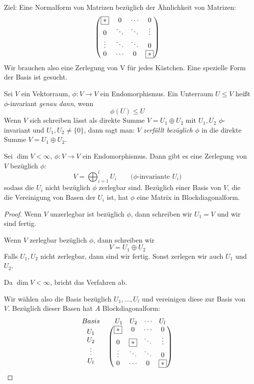 \documentclass[a4paper, 10pt]{scrbook}
\begin{document}
Ziel: Eine Normalform von Matrizen bezüglich der Ähnlichkeit von Matrizen:
\[
\begin{pmatrix}\fbox{$*$} & 0 & \cdots & 0 \\ 0 & \ddots & \ddots & \vdots \\ \vdots & \ddots & \ddots & 0 \\ 0 & \cdots & 0 & \fbox{$*$}  \end{pmatrix}
\]
Wir brauchen also eine Zerlegung von V für jedes Kästchen.  Eine spezielle Form der Basis ist gesucht.

\begin{df}
\label{12.6}
Sei $V$ ein Vektorraum, $\phi:V\to V$ ein Endomorphismus.
Ein Unterraum $U\le V$ heißt $\phi$-invariant \emph{genau dann}, wenn
\[
\phi(U) \le U
\]
Wenn $V$ sich schreiben lässt als direkte Summe $V=U_1\oplus U_2$ mit $U_1,U_2$ $\phi$-invariant und $U_1,U_2\neq \{0\}$,
dann sagt man: $V$ \emph{zerfällt bezüglich $\phi$} in die direkte Summe $V=U_1\oplus U_2$.
\end{df}

\begin{lem}
\label{lem:12.7}
Sei $\dim V<\infty$, $\phi:V\to V$ ein Endomorphismus.
Dann gibt es eine Zerlegung von $V$ bezüglich $\phi$:
\[
V=\bigoplus_{i=1}^l U_i\qquad \text{($\phi$-invariante $U_i$)}
\]
sodass die $U_i$ nicht bezüglich $\phi$ zerlegbar sind.
Bezüglich einer Basis von $V$, die die Vereinigung von Basen der $U_i$ ist,
hat $\phi$ eine Matrix in Blockdiagonalform.

\begin{proof}
Wenn $V$ unzerlegbar ist bezüglich $\phi$, dann schreiben wir $U_1=V$ und wir sind fertig.

Wenn $V$ zerlegbar bezüglich $\phi$, dann schreiben wir
\[
V=U_1\oplus U_2
\]
Falls $U_1,U_2$ nicht zerlegbar, dann sind wir fertig. Sonst zerlegen wir auch $U_1$ und $U_2$.

Da $\dim V<\infty$, bricht das Verfahren ab.

Wir wählen also die Basis bezüglich $U_1, ..., U_l$ und vereinigen diese zur Basis von $V$. Bezüglich dieser Basen hat $A$ Blockdiagonalform:
\[
\begin{tabular}{*{3}{>{$}c<{$}}}
  Basis & \begin{matrix} U_1 & U_2 & \cdots & U_l \end{matrix} \\
  \begin{matrix} U_1 \\ U_2 \\ \vdots \\ U_l \end{matrix} &  \begin{pmatrix}\fbox{$*$} & 0 & \cdots & 0 \\ 0 & \fbox{$*$} & \ddots & \vdots \\ \vdots & \ddots & \ddots & 0 \\ 0 & \cdots & 0 & \fbox{$*$}  \end{pmatrix}
\end{tabular}
\]
\end{proof}
\end{lem}
\end{document}
